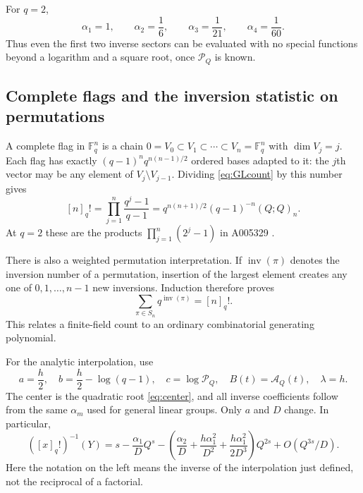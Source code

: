 \documentclass[11pt]{article}
\numberwithin{equation}{section}
\theoremstyle{definition}
\newcommand{\F}{\mathbb F}
\newcommand{\pp}[1]{(Q;Q)_{#1}}
\newcommand{\Pinf}{\mathcal P_Q}
\newcommand{\A}{\mathcal A_Q}
\begin{document}
For $q=2$,
\[
 \alpha_1=1,\qquad\alpha_2=\frac16,\qquad
 \alpha_3=\frac1{21},\qquad\alpha_4=\frac1{60}.
\]
Thus even the first two inverse sectors can be evaluated with no special functions beyond a logarithm and a square root, once $\Pinf$ is known.

\subsection{Complete flags and the inversion statistic on permutations}

A complete flag in $\F_q^n$ is a chain
$0=V_0\subset V_1\subset\cdots\subset V_n=\F_q^n$ with $\dim V_j=j$.
Each flag has exactly
$(q-1)^n q^{n(n-1)/2}$ ordered bases adapted to it: the $j$th vector may be any element of $V_j\setminus V_{j-1}$.
Dividing \eqref{eq:GLcount} by this number gives
\begin{equation}\label{eq:qfactorial}
 [n]_q!=\prod_{j=1}^n\frac{q^j-1}{q-1}
 =q^{n(n+1)/2}(q-1)^{-n}\pp{n}.
\end{equation}
At $q=2$ these are the products $\prod_{j=1}^n(2^j-1)$ in A005329 \cite{oeisflags}.

There is also a weighted permutation interpretation. If $\operatorname{inv}(\pi)$ denotes the inversion number of a permutation, insertion of the largest element creates any one of $0,1,\ldots,n-1$ new inversions. Induction therefore proves
\begin{equation}\label{eq:Mahonian}
 \sum_{\pi\in S_n}q^{\operatorname{inv}(\pi)}=[n]_q!.
\end{equation}
This relates a finite-field count to an ordinary combinatorial generating polynomial.

For the analytic interpolation, use
\begin{equation}\label{eq:flagphase}
 a=\frac h2,\quad b=\frac h2-\log(q-1),\quad
 c=\log\Pinf,\quad B(t)=\A(t),\quad\lambda=h.
\end{equation}
The center is the quadratic root \eqref{eq:center}, and all inverse coefficients follow from the same $\alpha_m$ used for general linear groups. Only $a$ and $D$ change. In particular,
\begin{equation}\label{eq:flaginverse}
 ([x]_q!)^{-1}(Y)
 =s-\frac{\alpha_1}{D}Q^s
 -\left(\frac{\alpha_2}{D}
   +\frac{h\alpha_1^2}{D^2}
   +\frac{h\alpha_1^2}{2D^3}\right)Q^{2s}
 +O(Q^{3s}/D).
\end{equation}
Here the notation on the left means the inverse of the interpolation just defined, not the reciprocal of a factorial.
\end{document}
